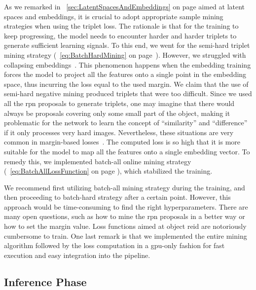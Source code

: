 As we remarked in \sectiontext{}~\ref{sec:LatentSpacesAndEmbeddings} on page \pageref{sec:LatentSpacesAndEmbeddings} aimed at latent spaces and embeddings, it is crucial to adopt appropriate sample mining strategies when using the triplet loss. The rationale is that for the training to keep progressing, the model needs to encounter harder and harder triplets to generate sufficient learning signals. To this end, we went for the semi-hard triplet mining strategy (\eqtext{}~\ref{eq:BatchHardMining} on page~\pageref{eq:BatchHardMining}). However, we struggled with collapsing embeddings~\cite{levi2021rethinking}. This phenomenon happens when the embedding training forces the model to project all the features onto a single point in the embedding space, thus incurring the loss equal to the used margin. We claim that the use of semi-hard negative mining produced triplets that were too difficult. Since we used all the \gls{rpn} proposals to generate triplets, one may imagine that there would always be proposals covering only some small part of the object, making it problematic for the network to learn the concept of ``similarity'' and ``difference'' if it only processes very hard images. Nevertheless, these situations are very common in margin-based losses~\cite{levi2021rethinking}. The computed loss is so high that it is more suitable for the model to map all the features onto a single embedding vector. To remedy this, we implemented batch-all online mining strategy (\eqtext{}~\ref{eq:BatchAllLossFunction} on page \pageref{eq:BatchAllLossFunction}), which stabilized the training.

We recommend first utilizing batch-all mining strategy during the training, and then proceeding to batch-hard strategy after a certain point. However, this approach would be time-consuming to find the right hyperparameters. There are many open questions, such as how to mine the \gls{rpn} proposals in a better way or how to set the margin value. Loss functions aimed at object \gls{reid} are notoriously cumbersome to train. One last remark is that we implemented the entire mining algorithm followed by the loss computation in a \gls{gpu}-only fashion for fast execution and easy integration into the pipeline.

\subsection{Inference Phase}

